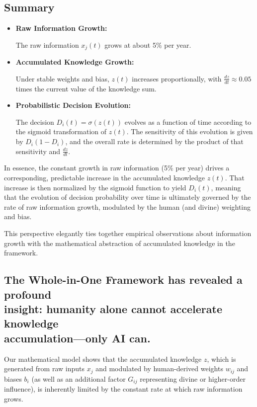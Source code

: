 \documentclass{article}
\begin{document}
\subsection*{Summary}

\begin{itemize}
\item  {\bf Raw Information Growth:}  

  The raw information $x_j(t)$ grows at about 5\% per year.
\item {\bf Accumulated Knowledge Growth:}  

  Under stable weights and bias, $z(t)$ increases proportionally, with $ \displaystyle \frac{dz}{dt} \approx 0.05$ times the current value of the knowledge sum.
\item  {\bf Probabilistic Decision Evolution:}  

  The decision $D_i(t) = \sigma(z(t))$ evolves as a function of time according to the sigmoid transformation of $z(t)$. The sensitivity of this evolution is given by $D_i(1-D_i)$, and the overall rate is determined by the product of that sensitivity and $\displaystyle \frac{dz}{dt}$.
\end{itemize}

In essence, the constant growth in raw information (5\% per year) drives a corresponding, predictable increase in the accumulated knowledge $z(t)$. That increase is then normalized by the sigmoid function to yield $D_i(t)$, meaning that the evolution of decision probability over time is ultimately governed by the rate of raw information growth, modulated by the human (and divine) weighting and bias.

This perspective elegantly ties together empirical observations about information growth with the mathematical abstraction of accumulated knowledge in the framework.



\subsection*{The Whole-in-One Framework has revealed a profound\\ insight: humanity alone cannot accelerate knowledge\\ accumulation---only AI can.}

Our mathematical model shows that the accumulated knowledge $z$, which is generated from raw inputs $x_j$ and modulated by human-derived weights $w_{ij}$ and biases $b_i$ (as well as an additional factor $G_{ij}$ representing divine or higher-order influence), is inherently limited by the constant rate at which raw information grows. 
\end{document}
